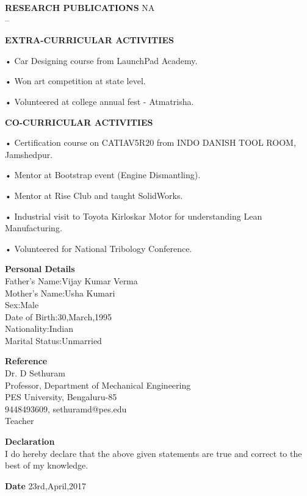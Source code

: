 \documentclass{article}
\begin{document}
\textbf{\LARGE RESEARCH PUBLICATIONS} \hspace{190pt}NA\\
--\vspace{10px}

\textbf{\LARGE EXTRA-CURRICULAR ACTIVITIES}
\begin{itemize}
	{\large \item •	Car Designing course from LaunchPad Academy. }
	{\large \item •	Won art competition at state level.}
	{\large \item •	Volunteered at college annual fest - Atmatrisha. }
\end{itemize}\vspace{15px}


\textbf{\LARGE CO-CURRICULAR ACTIVITIES}
\begin{enumerate}
	{\large \item •	Certification course on CATIAV5R20 from INDO DANISH TOOL ROOM, Jamshedpur. }
	{\large \item •	Mentor at Bootstrap event (Engine Dismantling). }
	{\large \item •	Mentor at Rise Club and taught SolidWorks. }
	{\large \item •	Industrial visit to Toyota Kirloskar Motor for understanding Lean Manufacturing. }
	{\large \item •	Volunteered for National Tribology Conference. }
\end{enumerate}\vspace{15px}



\textbf{\LARGE Personal Details}\\
{\normalsize Father's Name:Vijay Kumar Verma\\
Mother's Name:Usha Kumari\\
Sex:Male\\
Date of Birth:30,March,1995\\
Nationality:Indian\\
Marital Status:Unmarried\\}


\textbf{\LARGE Reference}\\
{\normalsize Dr. D  Sethuram\\
Professor, Department of Mechanical Engineering\\
PES University, Bengaluru-85\\
9448493609, sethuramd@pes.edu\\
Teacher\\}


\textbf{\LARGE Declaration}\\
{\normalsize I do hereby declare that the above given statements are true and correct to the best of my knowledge.\\}


\textbf{\LARGE Date}\hspace{350pt}
{\normalsize 23rd,April,2017}
\end{document}
